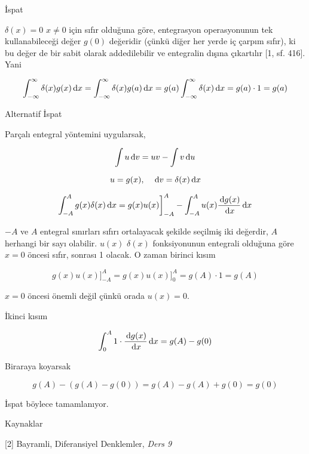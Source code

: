 \documentclass[12pt,fleqn]{article}\usepackage{../../common}
\begin{document}
İspat

$\delta(x)=0$ $x \ne 0$ için sıfır olduğuna göre, entegrasyon operasyonunun
tek kullanabileceği değer $g(0)$ değeridir (çünkü diğer her yerde iç çarpım
sıfır), ki bu değer de bir sabit olarak addedilebilir ve entegralin dışına
çıkartılır [1, sf. 416]. Yani

$$
\int_{-\infty}^{\infty} \delta(x)g(x) \,\mathrm{d} x = 
\int_{-\infty}^{\infty} \delta(x)g(a) \,\mathrm{d} x = 
g(a) \int_{-\infty}^{\infty} \delta(x) \,\mathrm{d} x = 
g(a) \cdot 1 = g(a)
$$


Alternatif İspat

Parçalı entegral yöntemini uygularsak,

$$ \int u \,\mathrm{d} v = uv - \int v \,\mathrm{d} u $$

$$ u = g(x), \quad \,\mathrm{d} v = \delta(x) \,\mathrm{d} x $$

$$
\int_{-A}^{A} g(x)\delta(x) \,\mathrm{d} x = g(x)u(x) \bigg]_{-A}^{A} -
\int_{-A}^{A} u(x) \frac{\,\mathrm{d} g(x)}{\,\mathrm{d} x}\,\mathrm{d} x
$$

$-A$ ve $A$ entegral sınırları sıfırı ortalayacak şekilde seçilmiş iki
değerdir, $A$ herhangi bir sayı olabilir. $u(x)$ $\delta(x)$ fonksiyonunun
entegrali olduğuna göre $x=0$ öncesi sıfır, sonrası 1 olacak. O zaman
birinci kısım

$$ g(x)u(x) \bigg]_{-A}^{A} = g(x)u(x) \bigg]_{0}^{A} = g(A)\cdot 1 = g(A)$$

$x=0$ öncesi önemli değil çünkü orada $u(x) = 0$. 

İkinci kısım

$$ \int_0^A 1\cdot \frac{\,\mathrm{d} g(x)}{\,\mathrm{d} x}\,\mathrm{d} x = g(A) - g(0) $$

Biraraya koyarsak

$$  g(A) - (g(A) - g(0)) = g(A) - g(A) + g(0) = g(0) $$

İspat böylece tamamlanıyor.

Kaynaklar 

[2] Bayramli, Diferansiyel Denklemler, {\em Ders 9}
\end{document}
